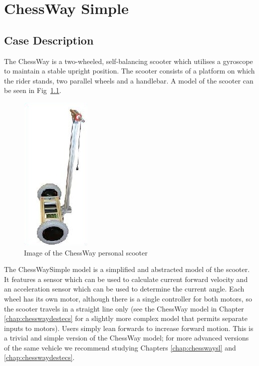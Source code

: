 \chapter{ChessWay Simple} \label{chap:chesswaysimple}
\section{Case Description} The ChessWay is a two-wheeled,
self-balancing scooter which utilises a gyroscope to maintain a stable
upright position. The scooter consists of a platform on which the
rider stands, two parallel wheels and a handlebar.  A model of the
scooter can be seen in Fig~\ref{fig:chessWaySimple}.

\begin{figure}[!ht] \centering
\includegraphics{chessWaySimple/chesswaySimple.JPG}
\caption{Image of the ChessWay personal scooter
\label{fig:chessWaySimple}} \end{figure}

The ChessWaySimple model is a simplified and abstracted model of the
scooter.  It features a sensor which can be used to calculate current
forward velocity and an acceleration sensor which can be used to
determine the current angle. Each wheel has its own motor, although
there is a single controller for both motors, so the scooter travels
in a straight line only (see the ChessWay \DESTECS model in Chapter
\ref{chap:chesswaydestecs} for a slightly more complex model that
permits separate inputs to motors). Users simply lean forwards to
increase forward motion.  This is a trivial and simple version of the
ChessWay model; for more advanced versions of the same vehicle we
recommend studying Chapters \ref{chap:chesswaysl} and
\ref{chap:chesswaydestecs}.


